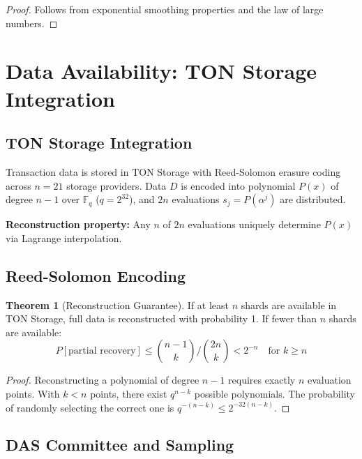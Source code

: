 \documentclass[12pt,a4paper]{article}
\theoremstyle{definition}
\newtheorem{theorem}{Theorem}[section]
\theoremstyle{remark}
\begin{document}
\begin{proof}
Follows from exponential smoothing properties and the law of large numbers.
\end{proof}


\section{Data Availability: TON Storage Integration}
\label{sec:data-availability}

\subsection{TON Storage Integration}

Transaction data is stored in TON Storage with Reed-Solomon erasure coding across $n = 21$ storage providers. Data $D$ is encoded into polynomial $P(x)$ of degree $n-1$ over $\mathbb{F}_q$ ($q = 2^{32}$), and $2n$ evaluations $s_j = P(\alpha^j)$ are distributed.

\textbf{Reconstruction property:} Any $n$ of $2n$ evaluations uniquely determine $P(x)$ via Lagrange interpolation.

\subsection{Reed-Solomon Encoding}

\begin{theorem}[Reconstruction Guarantee]
\label{thm:reconstruction}
If at least $n$ shards are available in TON Storage, full data is reconstructed with probability 1. If fewer than $n$ shards are available:
\begin{equation}
P[\text{partial recovery}] \leq \binom{n-1}{k} \bigg/ \binom{2n}{k} < 2^{-n} \quad \text{for } k \geq n
\end{equation}
\end{theorem}

\begin{proof}
Reconstructing a polynomial of degree $n-1$ requires exactly $n$ evaluation points. With $k < n$ points, there exist $q^{n-k}$ possible polynomials. The probability of randomly selecting the correct one is $q^{-(n-k)} \leq 2^{-32(n-k)}$.
\end{proof}

\subsection{DAS Committee and Sampling}
\end{document}
